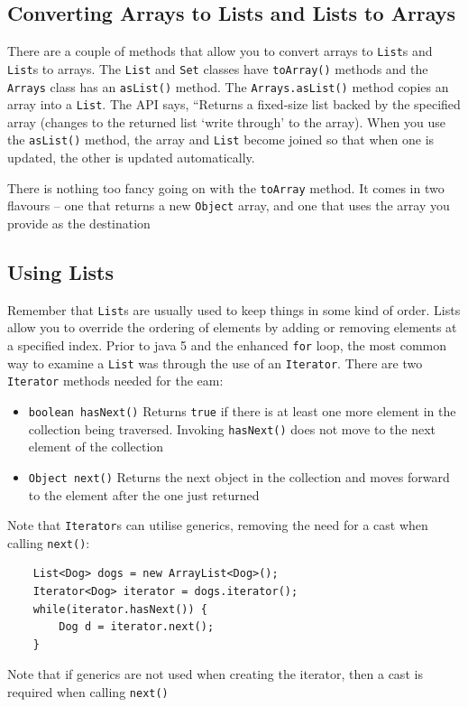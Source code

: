 \subsection{Converting Arrays to Lists and Lists to Arrays}
There are a couple of methods that allow you to convert arrays to \verb#List#s 
and \verb#List#s to arrays. The \verb#List# and \verb#Set# classes have 
\verb#toArray()# methods and the \verb#Arrays# class has an \verb#asList()# 
method. The \verb#Arrays.asList()# method copies an array into a \verb#List#.  
The API says, ``Returns a fixed-size list backed by the specified array 
(changes to the returned list `write through' to the array). When you use the 
\verb#asList()# method, the array and \verb#List# become joined so that when 
one is updated, the other is updated automatically.

There is nothing too fancy going on with the \verb#toArray# method. It comes in 
two flavours -- one that returns a new \verb#Object# array, and one that uses 
the array you provide as the destination

\subsection{Using Lists}
Remember that \verb#List#s are usually used to keep things in some kind of 
order. Lists allow you to override the ordering of elements by adding or 
removing elements at a specified index. Prior to java 5 and the enhanced 
\verb#for# loop, the most common way to examine a \verb#List# was through the 
use of an \verb#Iterator#. There are two \verb#Iterator# methods needed for the 
eam:
\begin{itemize}
    \item \verb#boolean hasNext()# Returns \verb#true# if there is at least one 
    more element in the collection being traversed. Invoking \verb#hasNext()# 
    does not move to the next element of the collection
    \item \verb#Object next()# Returns the next object in the collection and 
    moves forward to the element after the one just returned
\end{itemize}
Note that \verb#Iterator#s can utilise generics, removing the need for a cast 
when calling \verb#next()#:
\begin{verbatim}
    List<Dog> dogs = new ArrayList<Dog>();
    Iterator<Dog> iterator = dogs.iterator();
    while(iterator.hasNext()) {
        Dog d = iterator.next();
    }
\end{verbatim}
Note that if generics are not used when creating the iterator, then a cast is 
required when calling \verb#next()#

